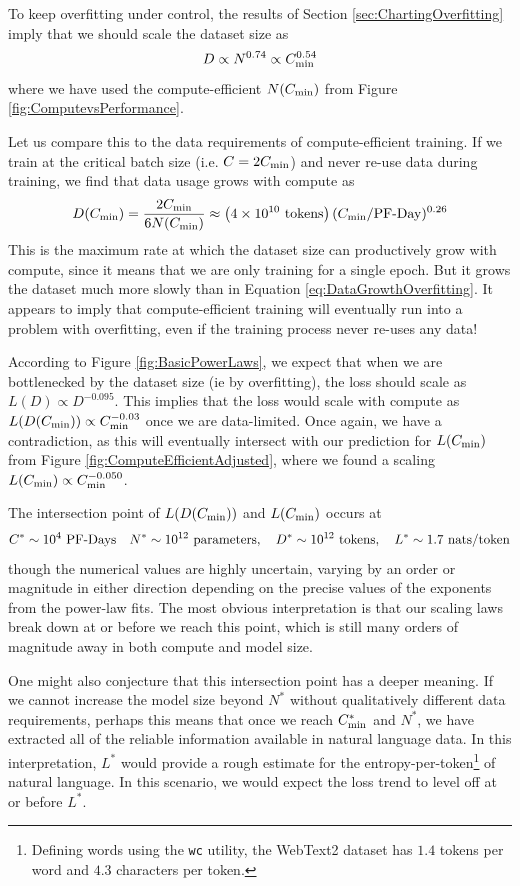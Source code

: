 \documentclass[english]{article}
\newcommand{\be}{\begin{equation}}
\newcommand{\ee}{\end{equation}}
\begin{document}
To keep overfitting under control, the results of Section \ref{sec:ChartingOverfitting} imply that we should scale the dataset size as
\be
\label{eq:DataGrowthOverfitting}
D \propto N^{0.74} \propto C_{\rm min}^{0.54}
\ee
where we have used the compute-efficient $N(C_{\rm min})$ from Figure \ref{fig:ComputevsPerformance}.

Let us compare this to the data requirements of compute-efficient training.  If we train at the critical batch size (i.e. $C=2C_{\rm min}$) and never re-use data during training, we find that data usage grows with compute as
\be
D (C_{\rm min}) = \frac{2C_{\rm min}}{6 N(C_{\rm min})} \approx \left( 4 \times 10^{10}  \ {\rm tokens} \right) (C_{\rm min} / \mathrm{PF}{\text -}\mathrm{Day}  )^{0.26} 
\ee
This is the maximum rate at which the dataset size can productively grow with compute, since it means that we are only training for a single epoch.  But it grows the dataset much more slowly than in Equation \eqref{eq:DataGrowthOverfitting}.  It appears to imply that compute-efficient training will eventually run into a problem with overfitting, even if the training process never re-uses any data!


 
According to Figure \ref{fig:BasicPowerLaws}, we expect that when we are bottlenecked by the dataset size (ie by overfitting), the loss should scale as $L(D) \propto D^{-0.095}$.  This implies that the loss would scale with compute as $L(D(C_{\rm min})) \propto C_{\rm min}^{-0.03}$ once we are data-limited.  Once again, we have a contradiction, as this will eventually intersect with our prediction for $L(C_{\rm min})$ from Figure \ref{fig:ComputeEfficientAdjusted}, where we found a scaling $L(C_{\rm min}) \propto C_{\rm min}^{-0.050}$.  

The intersection point of $L(D(C_{\rm min}))$ and $L(C_{\rm min})$ occurs at
\be
C^* \sim 10^4~\mathrm{PF}{\text -}\mathrm{Days}
\quad
N^* \sim 10^{12}~\text{parameters},
\quad
D^* \sim 10^{12}~\text{tokens},
\quad
L^* \sim 1.7~\text{nats/token}
\label{eq:SpecialPoint}
\ee
though the numerical values are highly uncertain, varying by an order or magnitude in either direction depending on the precise values of the exponents from the power-law fits.  The most obvious interpretation is that our scaling laws break down at or before we reach this point, which is still many orders of magnitude away in both compute and model size.  

One might also conjecture that this intersection point has a deeper meaning.  If we cannot increase the model size beyond $N^*$ without qualitatively different data requirements, perhaps this means that once we reach $C_{\rm min}^*$ and $N^*$, we have extracted all of the reliable information available in natural language data.  In this interpretation, $L^*$ would provide a rough estimate for the entropy-per-token\footnote{Defining words using the \texttt{wc} utility, the WebText2 dataset has $1.4$ tokens per word and $4.3$ characters per token. } of natural language.  In this scenario, we would expect the loss trend to level off at or before $L^*$.
\end{document}

